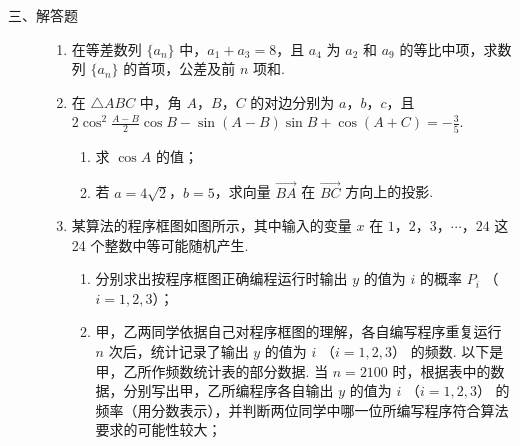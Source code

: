 \begin{description}

    \item[三、解答题]

    \begin{enumerate}[leftmargin=5pt]

      \addtocounter{enumi}{+15}

        \item 在等差数列 \(\{a_{n}\}\) 中，\(a_{1} + a_{3} = 8\)，且 \(a_{4}\) 为 \(a_{2}\) 和 \(a_{9}\) 的等比中项，求数列 \(\{a_{n}\}\) 的首项，公差及前 \(n\) 项和.

        \item 在 \(\triangle ABC\) 中，角 \(A\)，\(B\)，\(C\) 的对边分别为 \(a\)，\(b\)，\(c\)，且 \(2\cos^2\frac{A - B}{2}\cos B - \sin (A - B)\sin B + \cos (A + C) = -\frac{3}{5}\).
\begin{enumerate}
\item 求 \(\cos A\) 的值；
\item 若 \(a = 4\sqrt{2}\)，\(b = 5\)，求向量 \(\overrightarrow{BA}\) 在 \(\overrightarrow{BC}\) 方向上的投影.
\end{enumerate}

        \item 某算法的程序框图如图所示，其中输入的变量 \(x\) 在 \(1\)，\(2\)，\(3\)，\(\cdots\)，\(24\) 这 24 个整数中等可能随机产生.

\begin{enumerate}
\item 分别求出按程序框图正确编程运行时输出 \(y\) 的值为 \(i\) 的概率 \(P_{i}\) （\(i = 1, 2, 3\)）；
\item 甲，乙两同学依据自己对程序框图的理解，各自编写程序重复运行 \(n\) 次后，统计记录了输出 \(y\) 的值为 \(i\) （\(i = 1, 2, 3\)） 的频数. 以下是甲，乙所作频数统计表的部分数据. 当 \(n = 2100\) 时，根据表中的数据，分别写出甲，乙所编程序各自输出 \(y\) 的值为 \(i\) （\(i = 1, 2, 3\)） 的频率（用分数表示），并判断两位同学中哪一位所编写程序符合算法要求的可能性较大；


\end{enumerate}
\end{enumerate}
\end{description}
